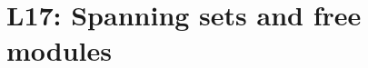 \documentclass[../Main.tex]{subfiles}
\begin{document}
\chapter{L17: Spanning sets and free modules}
\end{document}
